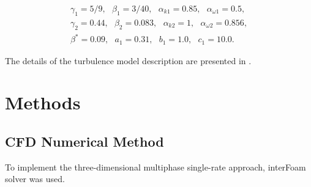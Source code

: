 \documentclass[applsci,article,submit,moreauthors,pdftex]{Definitions/mdpi}
\begin{document}
\begin{equation}
	\label{kOmegaSstConstantsInit}
	\begin{aligned}
		\gamma_1 = 5 / 9,\ \ \ \beta_1 = 3 / 40,\ \ \ \alpha_{k1} = 0.85,\ \ \ \alpha_{\omega1} = 0.5,\\
		\gamma_2 = 0.44,\ \ \ \beta_2 = 0.083,\ \ \ \alpha_{k2} = 1,\ \ \ \alpha_{\omega 2} = 0.856,\\
		\beta^* = 0.09,\ \ \ a_1 = 0.31,\ \ \ b_1 = 1.0,\ \ \ c_1 = 10.0.
	\end{aligned}
\end{equation}

The details of the turbulence model description are presented in \cite{Menter1993, MenterKuntzLangtry2003}.



 
\section{Methods}
\subsection{CFD Numerical Method}

To implement the three-dimensional multiphase single-rate approach, interFoam \cite{Rusche2003ComputationalFD} solver was used.
\end{document}
